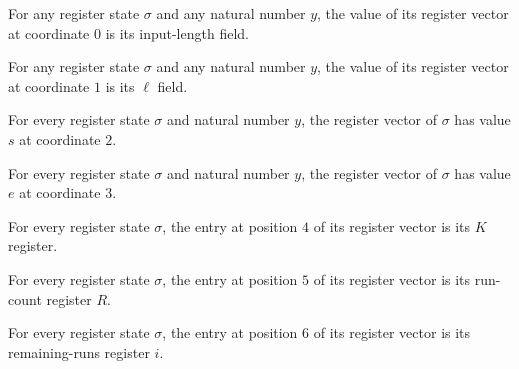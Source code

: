 \begin{lemma}
\label{Randomized.PolyAmp.Reg.v_0}
\leanok
{}
For any register state $\sigma$ and any natural number $y$, the value of its register
vector at coordinate $0$ is its input-length field.
\end{lemma}

\begin{lemma}
\label{Randomized.PolyAmp.Reg.v_1}
\leanok
{}
For any register state $\sigma$ and any natural number $y$, the value of its register
vector at coordinate $1$ is its $\ell$ field.
\end{lemma}

\begin{lemma}
\label{Randomized.PolyAmp.Reg.v_2}
\leanok
{}
For every register state $\sigma$ and natural number $y$, the register vector of
$\sigma$ has value $s$ at coordinate $2$.
\end{lemma}

\begin{lemma}
\label{Randomized.PolyAmp.Reg.v_3}
\leanok
{}
For every register state $\sigma$ and natural number $y$, the register vector of
$\sigma$ has value $e$ at coordinate $3$.
\end{lemma}

\begin{lemma}
\label{Randomized.PolyAmp.Reg.v_4}
\leanok
{}
For every register state $\sigma$, the entry at position $4$ of its register vector is
its $K$ register.
\end{lemma}

\begin{lemma}
\label{Randomized.PolyAmp.Reg.v_5}
\leanok
{}
For every register state $\sigma$, the entry at position $5$ of its register vector is
its run-count register $R$.
\end{lemma}

\begin{lemma}
\label{Randomized.PolyAmp.Reg.v_6}
\leanok
{}
For every register state $\sigma$, the entry at position $6$ of its register vector is
its remaining-runs register $i$.
\end{lemma}

